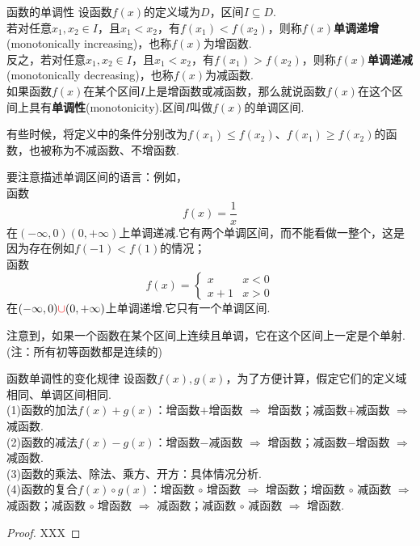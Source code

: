 \documentclass[lang=cn, zihao=4.5]{elegantbook}
\begin{document}
\begin{definition}{函数的单调性} %
    设函数$f(x)$的定义域为$D$，区间$I \subseteq D$.\\
    若对任意$x_1,x_2 \in I$，且$x_1 < x_2$，有$f(x_1) < f(x_2)$，则称$f(x)$\textbf{单调递增}(monotonically increasing)，也称$f(x)$为增函数.\\
    反之，若对任意$x_1,x_2 \in I$，且$x_1 < x_2$，有$f(x_1) > f(x_2)$，则称$f(x)$\textbf{单调递减}(monotonically decreasing)，也称$f(x)$为减函数.\\
    如果函数$f(x)$在某个区间$I$上是增函数或减函数，那么就说函数$f(x)$在这个区间上具有\textbf{单调性}(monotonicity).区间$I$叫做$f(x)$的单调区间.
\end{definition}
\begin{remark}
    有些时候，将定义中的条件分别改为$f(x_1) \leq f(x_2)$、$f(x_1) \geq f(x_2)$的函数，也被称为不减函数、不增函数.
\end{remark}
\begin{note}
    要注意描述单调区间的语言：例如，\\
    函数$$f(x)=\frac{1}{x}$$
    在$(- \infty , 0)$\color{red}{和}\color{black}$(0 , + \infty)$上单调递减.它有两个单调区间，而不能看做一整个，这是因为存在例如$f(-1) < f(1)$的情况；\\
    函数$$ f(x)=\begin{cases}
    	x &x<0 \\
    	x+1 &x>0
    \end{cases}$$
    在$(- \infty , 0) \color{red}{\cup}\color{black} (0 , + \infty)$上单调递增.它只有一个单调区间.
\end{note}

注意到，如果一个函数在某个区间上连续且单调，它在这个区间上一定是个单射.(注：所有初等函数都是连续的)

\begin{proposition}{函数单调性的变化规律}
    设函数$f(x),g(x)$，为了方便计算，假定它们的定义域相同、单调区间相同.\\
    (1)函数的加法$f(x)+g(x)$：增函数$+$增函数 $\Rightarrow$ 增函数；减函数$+$减函数 $\Rightarrow$ 减函数.\\
    (2)函数的减法$f(x)-g(x)$：增函数$-$减函数 $\Rightarrow$ 增函数；减函数$-$增函数 $\Rightarrow$ 减函数.\\
    (3)函数的乘法、除法、乘方、开方：具体情况分析.\\
    (4)函数的复合$f(x) \circ g(x)$：增函数 $\circ$ 增函数 $\Rightarrow$ 增函数；增函数 $\circ$ 减函数 $\Rightarrow$ 减函数；减函数 $\circ$ 增函数 $\Rightarrow$ 减函数；减函数 $\circ$ 减函数 $\Rightarrow$ 增函数.
\end{proposition}
\begin{proof}
    XXX
\end{proof}
\end{document}
